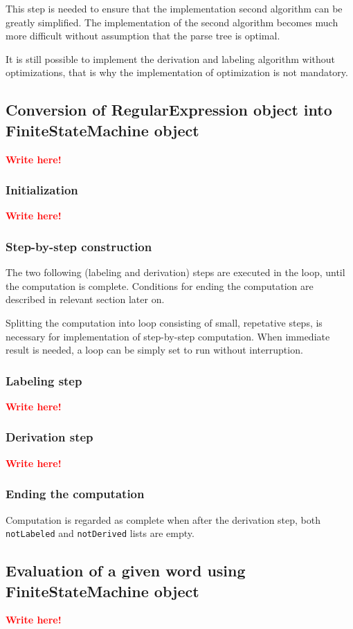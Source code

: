 \documentclass{article}
\newcommand{\writehere}{\textbf{\textcolor{red}{Write here!}}}
\begin{document}
This step is needed to ensure that the implementation second algorithm can be greatly simplified.
The implementation of the second algorithm becomes much more difficult without assumption that the
parse tree is optimal.

It is still possible to implement the derivation and labeling algorithm without optimizations, that
is why the implementation of optimization is not mandatory.

\newpage

\subsection{Conversion of RegularExpression object into FiniteStateMachine object}

\writehere

\subsubsection{Initialization}

\writehere

\subsubsection{Step-by-step construction}

The two following (labeling and derivation) steps are executed in the loop, until the computation is
complete. Conditions for ending the computation are described in relevant section later on.

Splitting the computation into loop consisting of small, repetative steps, is necessary for
implementation of step-by-step computation. When immediate result is needed, a loop can be simply
set to run without interruption.

\subsubsection*{Labeling step}

\writehere

\subsubsection*{Derivation step}

\writehere

\subsubsection{Ending the computation}

Computation is regarded as complete when after the derivation step, both \verb|notLabeled| and
\verb|notDerived| lists are empty.

\subsection{Evaluation of a given word using FiniteStateMachine object}

\writehere
\end{document}
